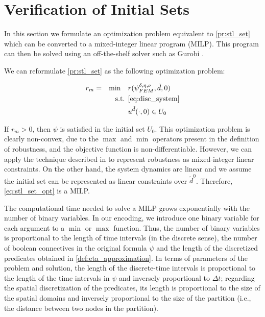 \documentclass[oribibl]{llncs/llncs}
\begin{document}
\section{Verification of Initial Sets}
\label{sec:verification_of_initial_sets}

In this section we formulate an optimization problem equivalent to
\cref{pr:stl_set} which can be converted to a mixed-integer linear program
(MILP). This program can then be solved using an off-the-shelf solver such 
as Gurobi \cite{gurobi}.

We can reformulate \cref{pr:stl_set} as the following optimization problem:

\begin{equation}
    \label{eq:stl_set_opt}
    \begin{aligned}
        &r_m = &\min \quad &r(\psi^{\delta, \eta, \nu}_{FEM}, \tilde{d}, 0) \\
        &  &\text{s.t. } &\cref{eq:disc_system} \\
        &  & &u^{\tilde{d}}(\cdot, 0) \in U_0
    \end{aligned}
\end{equation}

If $r_m > 0$, then $\psi$ is satisfied in the initial set $U_0$. This
optimization problem is clearly non-convex, due to the $\max$ and $\min$
operators present in the definition of robustness, and the objective function is
non-differentiable. However, we can apply the technique described in
\cite{sadraddini_robust_2015} to
represent robustness as mixed-integer linear constraints. On the other hand, the
system dynamics are linear and we assume the initial set can be represented as
linear constraints over $\tilde{d}^0$. Therefore, \cref{eq:stl_set_opt} is a
MILP.

The computational time needed to solve a MILP grows exponentially with 
the number of binary variables. In our encoding, we introduce one
binary variable for each argument to a $\min$ or $\max$ function. Thus, the
number of binary variables is proportional to the length of time intervals (in
the discrete sense), the number of boolean connectives in the original formula
$\psi$ and the length of the discretized predicates obtained in
\cref{def:eta_approximation}. In terms of parameters of the problem and solution,
the length of the discrete-time intervals is proportional to the length of the time
intervals in $\psi$ and inversely proportional to $\Delta t$; regarding the
spatial discretization of the predicates, its length is proportional to the size
of the spatial domains and inversely proportional to the size of the partition
(i.e., the distance between two nodes in the partition).
\end{document}
